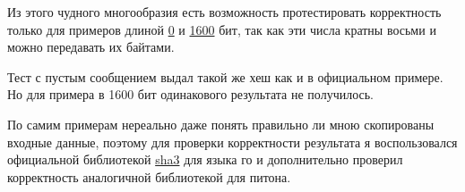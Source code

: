 \documentclass[12pt]{article}
\begin{document}
Из этого чудного многообразия есть возможность протестировать корректность только для
примеров длиной
\href{https://csrc.nist.gov/CSRC/media/Projects/Cryptographic-Standards-and-Guidelines/documents/examples/SHA3-256_Msg0.pdf}{0}
и
\href{https://csrc.nist.gov/CSRC/media/Projects/Cryptographic-Standards-and-Guidelines/documents/examples/SHA3-256_1600.pdf}{1600}
бит, так как эти числа кратны восьми и можно передавать их байтами.

Тест с пустым сообщением выдал такой же хеш как и в официальном примере. Но для примера в 1600 бит
одинакового результата не получилось.

По самим примерам нереально даже понять правильно ли мною скопированы входные данные,
поэтому для проверки корректности результата я воспользовался официальной библиотекой
\href{https://pkg.go.dev/golang.org/x/crypto/sha3?tab=doc}{sha3} для языка го и
дополнительно проверил корректность аналогичной библиотекой для питона.
\end{document}

